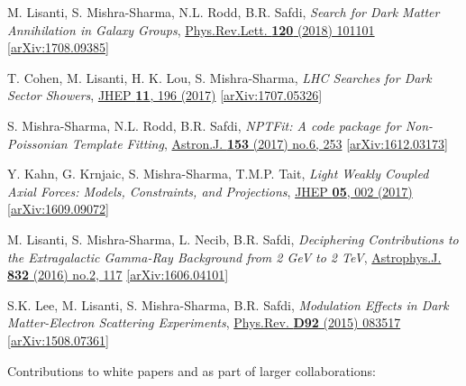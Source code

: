 \documentclass[letterpaper,11pt]{article}
\newenvironment{packed_enumerate}[1][]{
\begin{etaremune}[#1]
  \setlength{\itemsep}{3.9pt}
  \setlength{\parskip}{0pt}
  \setlength{\parsep}{0pt}}{\end{etaremune}
}
\begin{document}
\begin{packed_enumerate}[start=26]
  \item M. Lisanti, S. Mishra-Sharma, N.L. Rodd, B.R. Safdi, \emph{Search for Dark Matter Annihilation in Galaxy Groups},  \href{https://journals.aps.org/prl/abstract/10.1103/PhysRevLett.120.101101}{Phys.Rev.Lett. \textbf{120} (2018) 101101} \href{https://arxiv.org/abs/1708.09385}{[arXiv:1708.09385]}

  \item T. Cohen, M. Lisanti, H. K. Lou, S. Mishra-Sharma, \emph{LHC Searches for Dark Sector Showers},  \href{https://link.springer.com/article/10.1007/JHEP11(2017)196}{JHEP \textbf{11}, 196 (2017)}  \href{https://arxiv.org/abs/1707.05326}{ [arXiv:1707.05326]}

  \item S. Mishra-Sharma, N.L. Rodd, B.R. Safdi, \emph{NPTFit: A code package for Non-Poissonian Template Fitting},  \href{http://iopscience.iop.org/article/10.3847/1538-3881/aa6d5f/meta}{Astron.J. \textbf{153} (2017) no.6, 253}  \href{https://arxiv.org/abs/1612.03173}{ [arXiv:1612.03173]}

  \item Y. Kahn, G. Krnjaic, S. Mishra-Sharma, T.M.P. Tait, \emph{Light Weakly Coupled Axial Forces: Models, Constraints, and Projections},  \href{https://link.springer.com/article/10.1007%2FJHEP05%282017%29002}{JHEP \textbf{05}, 002 (2017)}  \href{https://arxiv.org/abs/1609.09072}{[arXiv:1609.09072]}

  \item M. Lisanti, S. Mishra-Sharma, L. Necib, B.R. Safdi, \emph{Deciphering Contributions to the Extragalactic Gamma-Ray Background from 2 GeV to 2 TeV},  \href{http://iopscience.iop.org/article/10.3847/0004-637X/832/2/117/meta}{Astrophys.J. \textbf{832} (2016) no.2, 117} \href{https://arxiv.org/abs/1606.04101}{[arXiv:1606.04101]}

  \item S.K. Lee, M. Lisanti, S. Mishra-Sharma, B.R. Safdi, \emph{Modulation Effects in Dark Matter-Electron Scattering Experiments}, \href{https://journals.aps.org/prd/abstract/10.1103/PhysRevD.92.083517}{Phys.Rev. \textbf{D92} (2015) 083517} \href{https://arxiv.org/abs/1508.07361}{[arXiv:1508.07361]}
\end{packed_enumerate}

\noindent
Contributions to white papers and as part of larger collaborations:
\end{document}
